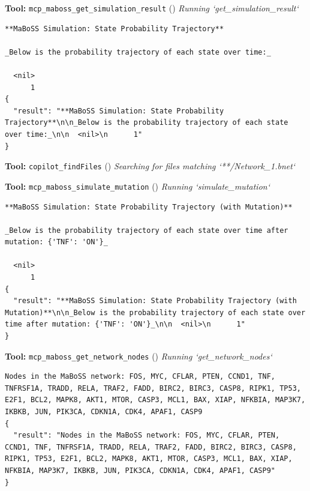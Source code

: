 \documentclass[11pt,a4paper]{article}
\begin{document}
\begin{toolokbox}
\textbf{Tool:} \texttt{mcp\_maboss\_get\_simulation\_result} (\checkmark)
\textit{Running `get\_simulation\_result`}
\begin{lstlisting}
**MaBoSS Simulation: State Probability Trajectory**

_Below is the probability trajectory of each state over time:_

  <nil>
      1
{
  "result": "**MaBoSS Simulation: State Probability Trajectory**\n\n_Below is the probability trajectory of each state over time:_\n\n  <nil>\n      1"
}
\end{lstlisting}
\end{toolokbox}
\begin{toolokbox}
\textbf{Tool:} \texttt{copilot\_findFiles} (\checkmark)
\textit{Searching for files matching `**/Network\_1.bnet`}
\end{toolokbox}
\begin{toolokbox}
\textbf{Tool:} \texttt{mcp\_maboss\_simulate\_mutation} (\checkmark)
\textit{Running `simulate\_mutation`}
\begin{lstlisting}
**MaBoSS Simulation: State Probability Trajectory (with Mutation)**

_Below is the probability trajectory of each state over time after mutation: {'TNF': 'ON'}_

  <nil>
      1
{
  "result": "**MaBoSS Simulation: State Probability Trajectory (with Mutation)**\n\n_Below is the probability trajectory of each state over time after mutation: {'TNF': 'ON'}_\n\n  <nil>\n      1"
}
\end{lstlisting}
\end{toolokbox}
\begin{toolokbox}
\textbf{Tool:} \texttt{mcp\_maboss\_get\_network\_nodes} (\checkmark)
\textit{Running `get\_network\_nodes`}
\begin{lstlisting}
Nodes in the MaBoSS network: FOS, MYC, CFLAR, PTEN, CCND1, TNF, TNFRSF1A, TRADD, RELA, TRAF2, FADD, BIRC2, BIRC3, CASP8, RIPK1, TP53, E2F1, BCL2, MAPK8, AKT1, MTOR, CASP3, MCL1, BAX, XIAP, NFKBIA, MAP3K7, IKBKB, JUN, PIK3CA, CDKN1A, CDK4, APAF1, CASP9
{
  "result": "Nodes in the MaBoSS network: FOS, MYC, CFLAR, PTEN, CCND1, TNF, TNFRSF1A, TRADD, RELA, TRAF2, FADD, BIRC2, BIRC3, CASP8, RIPK1, TP53, E2F1, BCL2, MAPK8, AKT1, MTOR, CASP3, MCL1, BAX, XIAP, NFKBIA, MAP3K7, IKBKB, JUN, PIK3CA, CDKN1A, CDK4, APAF1, CASP9"
}
\end{lstlisting}
\end{toolokbox}
\end{document}
